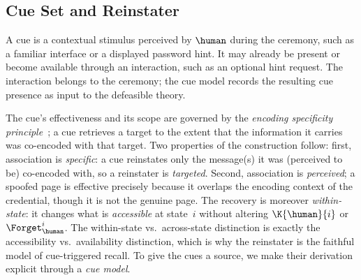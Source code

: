 \subsection{Cue Set and Reinstater}
\label{Subsec:Cue}

A cue is a contextual stimulus perceived by $\human$ during the ceremony, such as a familiar interface or a displayed password hint. It may already be present or become available through an interaction, such as an optional hint request. The interaction belongs to the ceremony; the cue model records the resulting cue presence as input to the defeasible theory.

The cue's effectiveness and its scope are governed by the \emph{encoding specificity principle}~\cite{tulving1973encoding}; a cue retrieves a target to the extent that the information it carries was co-encoded with that target. Two properties of the construction follow: first, association is \emph{specific}: a cue reinstates only the message(s) it was (perceived to be) co-encoded with, so a reinstater is \emph{targeted}. Second, association is \emph{perceived}; a spoofed page is effective precisely because it overlaps the encoding context of the credential, though it is not the genuine page. The recovery is moreover \emph{within-state}: it changes what is \emph{accessible} at state~$i$ without altering $\K{\human}{i}$ or $\Forget_\human^{i}$. The within-state vs.\ across-state distinction is exactly the accessibility vs.\ availability distinction, which is why the reinstater is the faithful model of cue-triggered recall. To give the cues a source, we make their derivation explicit through a \emph{cue model}.

